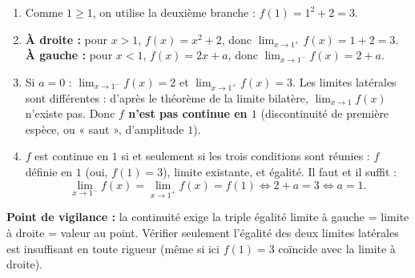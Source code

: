 \documentclass[11pt]{article}
\begin{document}
\begin{corrige}
\begin{enumerate}
\item Comme $1\geq 1$, on utilise la deuxième branche : $f(1)=1^2+2=\boxed{3}$.
\item \textbf{À droite :} pour $x>1$, $f(x)=x^2+2$, donc $\displaystyle\lim_{x\to 1^+}f(x)=1+2=3$.
\textbf{À gauche :} pour $x<1$, $f(x)=2x+a$, donc $\displaystyle\lim_{x\to 1^-}f(x)=2+a$.
\item Si $a=0$ : $\lim_{x\to 1^-}f(x)=2$ et $\lim_{x\to 1^+}f(x)=3$. Les limites latérales sont différentes : d'après le théorème de la limite bilatère, $\lim_{x\to 1}f(x)$ n'existe pas. Donc \textbf{$f$ n'est pas continue en $1$} (discontinuité de première espèce, ou « saut », d'amplitude $1$).
\item $f$ est continue en $1$ si et seulement si les trois conditions sont réunies : $f$ définie en $1$ (oui, $f(1)=3$), limite existante, et égalité. Il faut et il suffit :
\[ \lim_{x\to 1^-}f(x)=\lim_{x\to 1^+}f(x)=f(1)\iff 2+a=3\iff \boxed{a=1}. \]
\end{enumerate}
\textbf{Point de vigilance :} la continuité exige la triple égalité limite à gauche = limite à droite = valeur au point. Vérifier seulement l'égalité des deux limites latérales est insuffisant en toute rigueur (même si ici $f(1)=3$ coïncide avec la limite à droite).
\end{corrige}
\end{document}
